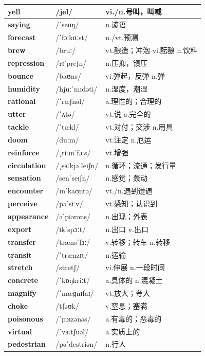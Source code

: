 \documentclass[14pt,a4paper]{extarticle}
\begin{document}
\begin{longtable}{ p{} p{} p{} }
\textbf{yell} & /jel/ & vi./n.号叫，叫喊 \\ \hline
\textbf{saying} & /ˈseɪɪŋ/ & n.谚语 \\ \hline
\textbf{forecast} & /ˈfɔːkɑːst/ & n./vt.预测 \\ \hline
\textbf{brew} & /bruː/ & vt.酿造；冲泡 \quad vi.酝酿 \quad n.饮料 \\ \hline
\textbf{repression} & /rɪˈpreʃn/ & n.压抑，镇压 \\ \hline
\textbf{bounce} & /baʊns/ & vi.弹起，反弹 \quad n.弹 \\ \hline
\textbf{humidity} & /hjuːˈmɪdəti/ & n.湿度，潮湿 \\ \hline
\textbf{rational} & /ˈræʃnəl/ & a.理性的；合理的 \\ \hline
\textbf{utter} & /ˈʌtə/ & vt.说 \quad a.完全的 \\ \hline
\textbf{tackle} & /ˈtækl/ & vt.对付；交涉 \quad n.用具 \\ \hline
\textbf{doom} & /duːm/ & vt.注定 \quad n.厄运 \\ \hline
\textbf{reinforce} & /ˌriːɪnˈfɔːs/ & vt.增强 \\ \hline
\textbf{circulation} & /ˌsɜːkjəˈleɪʃn/ & n.循环；流通；发行量 \\ \hline
\textbf{sensation} & /senˈseɪʃn/ & n.感觉；轰动 \\ \hline
\textbf{encounter} & /ɪnˈkaʊntə/ & vt./n.遇到遭遇 \\ \hline
\textbf{perceive} & /pəˈsiːv/ & vt.感知；认识到 \\ \hline
\textbf{appearance} & /əˈpɪərəns/ & n.出现；外表 \\ \hline
\textbf{export} & /ɪkˈspɔːt/ & n.出口 \quad v.出口 \\ \hline
\textbf{transfer} & /trænsˈfɜː/ & v.转移；转车 \quad n.转移 \\ \hline
\textbf{transit} & /ˈtrænzɪt/ & n.运输 \\ \hline
\textbf{stretch} & /stretʃ/ & vi.伸展 \quad n.一段时间 \\ \hline
\textbf{concrete} & /ˈkɒŋkriːt/ & a.具体的 \quad n.混凝土 \\ \hline
\textbf{magnify} & /ˈmæɡnɪfaɪ/ & vt.放大；夸大 \\ \hline
\textbf{choke} & /tʃəʊk/ & v.窒息；塞满 \\ \hline
\textbf{poisonous} & /ˈpɔɪzənəs/ & a.有毒的；恶毒的 \\ \hline
\textbf{virtual} & /ˈvɜːtʃuəl/ & a.实质上的 \\ \hline
\textbf{pedestrian} & /pəˈdestriən/ & n.行人 \\ \hline

\end{longtable}
\end{document}

